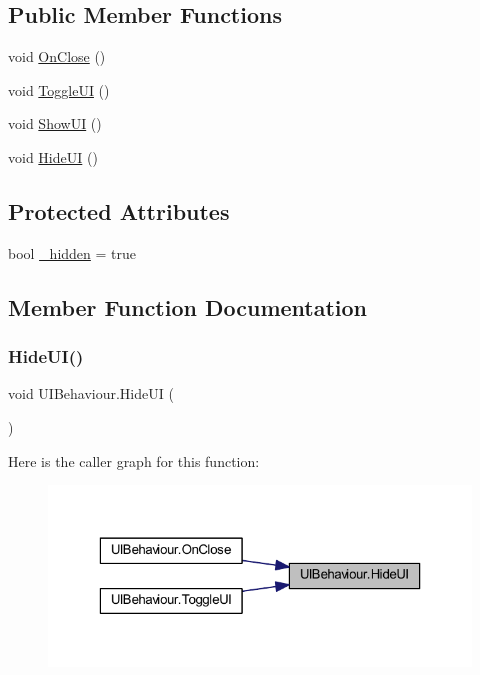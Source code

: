 \subsection*{Public Member Functions}
\begin{DoxyCompactItemize}
\item 
void \mbox{\hyperlink{class_u_i_behaviour_a058150104cbc5deee5bb2d2c8811380a}{On\+Close}} ()
\item 
void \mbox{\hyperlink{class_u_i_behaviour_a508b07927b86c1f75ab1eeb45674f040}{Toggle\+UI}} ()
\item 
void \mbox{\hyperlink{class_u_i_behaviour_a14585d2d40b493d7999564d8a51d51c5}{Show\+UI}} ()
\item 
void \mbox{\hyperlink{class_u_i_behaviour_a16ec3362b1f53b371aa8c5a8a3ec80e7}{Hide\+UI}} ()
\end{DoxyCompactItemize}
\subsection*{Protected Attributes}
\begin{DoxyCompactItemize}
\item 
bool \mbox{\hyperlink{class_u_i_behaviour_a0421d4dc2987f0c48b88cc6175d993e5}{\+\_\+hidden}} = true
\end{DoxyCompactItemize}


\subsection{Member Function Documentation}
\mbox{\label{class_u_i_behaviour_a16ec3362b1f53b371aa8c5a8a3ec80e7}} 
\subsubsection{\texorpdfstring{HideUI()}{HideUI()}}
{\footnotesize\ttfamily void U\+I\+Behaviour.\+Hide\+UI (\begin{DoxyParamCaption}{ }\end{DoxyParamCaption})}

Here is the caller graph for this function\+:\nopagebreak
\begin{figure}[H]
\begin{center}
\leavevmode
\includegraphics[width=323pt]{class_u_i_behaviour_a16ec3362b1f53b371aa8c5a8a3ec80e7_icgraph}
\end{center}
\end{figure}
\mbox{\label{class_u_i_behaviour_a058150104cbc5deee5bb2d2c8811380a}} 
